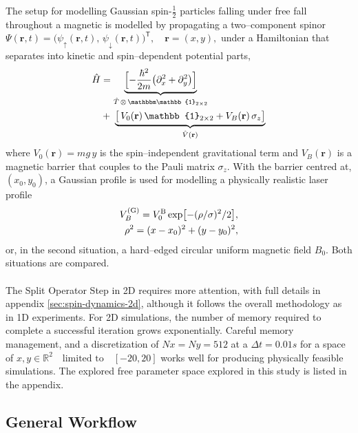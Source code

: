 \label{sec:spin-dynamics}

The setup for modelling Gaussian spin-$\frac{1}{2}$ particles falling under free fall throughout a magnetic is modelled by propagating a two–component spinor  
\(
\Psi(\mathbf r,t)=
\bigl(\psi_\uparrow(\mathbf r,t),\,
       \psi_\downarrow(\mathbf r,t)\bigr)^{\!\mathsf T},
\quad
\mathbf r=(x,y),
\)
under a Hamiltonian that separates into kinetic and spin–dependent
potential parts,  
\begin{align}
    \hat{H} &=      \underbrace{\vphantom{\bigl|}\Bigl[-\dfrac{\hbar^{2}}{2m}
      \bigl(\partial_x^{2}+\partial_y^{2}\bigr)\Bigr]}_{\hat{T}\,\otimes\,\mathbbm \mathbb{1}_{2\times2} } \\
      &+\;
      \underbrace{\bigl[\,V_0(\mathbf r)\,\mathbb{1}_{2\times2}
                      +V_B(\mathbf r)\,\sigma_z\bigr]}_{\hat{V}(\mathbf r)}
\end{align}
where  
\(V_0(\mathbf r)=mg\,y\) is the spin–independent gravitational term and  
\(V_B(\mathbf r)\) is a magnetic barrier that couples to the Pauli
matrix $\sigma_z$. With the barrier centred at, \((x_0,y_0)\), a Gaussian profile is used for modelling a physically realistic laser profile
\begin{align}
V_B^{(\text{G})}=V_0^{\text B}\exp[-(\rho/\sigma)^2/2],\\
\rho^2=(x-x_0)^2+(y-y_0)^2,
\end{align}
or, in the second situation, a hard–edged circular uniform magnetic field $B_0$. Both situations are compared.
\\\\
The Split Operator Step in 2D requires more attention, with full details in appendix \ref{sec:spin-dynamics-2d}, although it follows the overall methodology as in 1D experiments. For 2D simulations, the number of memory required to complete a successful iteration grows exponentially. Careful memory management, and a discretization of $Nx=Ny=512$ at a $\Delta t=0.01s$ for a space of $x,y \in \mathbb{R}^2 \quad \text{limited to} \quad [-20, 20]$ works well for producing physically feasible simulations. The explored free parameter space explored in this study is listed in the appendix.

\subsection{General Workflow}

